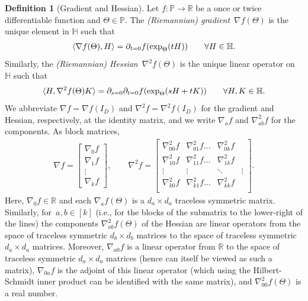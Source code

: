 \documentclass[aos]{imsart}
\theoremstyle{definition}
\newtheorem{definition}[theorem]{Definition}
\numberwithin{equation}{section}
\newcommand{\R}{{\mathbb{R}}}
\renewcommand{\P}{{\mathbb{P}}}
\renewcommand{\H}{{\mathbb{H}}}
\begin{document}
\begin{definition}[Gradient and Hessian]\label{def:hess grad}
Let $f\colon \P \to \R$ be a once or twice differentiable function and $\Theta \in \P$.
The \emph{(Riemannian) gradient}~$\nabla f(\Theta)$ is the unique element in $\H$ such that
\begin{align*}
  \braket{\nabla f(\Theta), H}
= \partial_{t=0} f(\exp_\Theta(tH))
\qquad \forall H \in \H.
\end{align*}
Similarly, the \emph{(Riemannian) Hessian}~$\nabla^2 f(\Theta)$ is the unique linear operator on~$\H$ such that
\begin{align*}
  \braket{H, \nabla^2 f(\Theta) K}
= \partial_{s=0} \partial_{t=0} f(\exp_{\Theta}(sH + tK))
\qquad \forall H,K \in \H.
\end{align*}
We abbreviate $\nabla f = \nabla f(I_D)$ and $\nabla^2 f = \nabla^2 f(I_D)$ for the gradient and Hessian, respectively, at the identity matrix, and we write $\nabla_a f$ and $\nabla^2_{ab}f$ for the components.
As block matrices,
\begin{align*}
  \nabla f = \left[\begin{array}{c} \nabla_0 f \\ \hline \nabla_1 f \\ \vdots \\ \nabla_k f \end{array}\right],
  \qquad
  \nabla^2 f = \left[\begin{array}{c|ccc}
  \nabla_{00}^2 f & \nabla_{01}^2 f \dots & \nabla_{0k}^2 f \\
    \hline\nabla_{10}^2 f & \nabla_{11}^2 f \dots & \nabla_{1k}^2 f \\
  \vdots  & \vdots & \ddots & \vdots \\
  \nabla_{k0}^2 f & \nabla_{k1}^2 f \dots & \nabla_{kk}^2 f \\
  \end{array}\right].
\end{align*}
Here, $\nabla_0 f \in \R$ and each $\nabla_a f(\Theta)$ is a $d_a \times d_a$ traceless symmetric matrix.
Similarly, for~$a, b \in [k]$ (i.e., for the blocks of the submatrix to the lower-right of the lines) the components $\nabla_{ab}^2f(\Theta)$ of the Hessian are linear operators from the space of traceless symmetric $d_b\times d_b$ matrices to the space of traceless symmetric $d_a \times d_a$ matrices.
Moreover, $\nabla_{a0}f$ is a linear operator from $\R$ to the space of traceless symmetric $d_a\times d_a$ matrices (hence can itself be viewed as such a matrix), $\nabla_{0a}f$ is the adjoint of this linear operator (which using the Hilbert-Schmidt inner product can be identified with the same matrix), and $\nabla^2_{00} f(\Theta)$ is a real number.

\end{definition}
\end{document}

